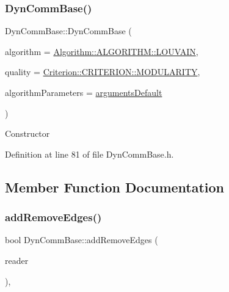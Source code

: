 \subsubsection{\texorpdfstring{Dyn\+Comm\+Base()}{DynCommBase()}\hspace{0.1cm}{\footnotesize\ttfamily [2/2]}}
{\footnotesize\ttfamily Dyn\+Comm\+Base\+::\+Dyn\+Comm\+Base (\begin{DoxyParamCaption}\item[{\hyperlink{classAlgorithm_a38e19a8c3dc51b97563a34d9e59a748d}{Algorithm\+::\+A\+L\+G\+O\+R\+I\+T\+HM}}]{algorithm = {\ttfamily \hyperlink{classAlgorithm_a38e19a8c3dc51b97563a34d9e59a748dab77e66715d6be972cdbf6cc4d990e732}{Algorithm\+::\+A\+L\+G\+O\+R\+I\+T\+H\+M\+::\+L\+O\+U\+V\+A\+IN}},  }\item[{const \hyperlink{classCriterion_a55594c223ce0837b8319c46c66cb648f}{Criterion\+::\+C\+R\+I\+T\+E\+R\+I\+ON} \&}]{quality = {\ttfamily \hyperlink{classCriterion_a55594c223ce0837b8319c46c66cb648fa2a7d416fbe43baf234420601ea73d946}{Criterion\+::\+C\+R\+I\+T\+E\+R\+I\+O\+N\+::\+M\+O\+D\+U\+L\+A\+R\+I\+TY}},  }\item[{\hyperlink{structProgramParameters}{Program\+Parameters} \&}]{algorithm\+Parameters = {\ttfamily \hyperlink{program_8h_ae2d819404495f80f31db7676c1329d19}{arguments\+Default}} }\end{DoxyParamCaption})\hspace{0.3cm}{\ttfamily [inline]}}

Constructor 

Definition at line 81 of file Dyn\+Comm\+Base.\+h.



\subsection{Member Function Documentation}
\mbox{\label{classDynCommBase_a85ff9898ef25b12f3e80842c7b2696fe}} 
\subsubsection{\texorpdfstring{add\+Remove\+Edges()}{addRemoveEdges()}}
{\footnotesize\ttfamily bool Dyn\+Comm\+Base\+::add\+Remove\+Edges (\begin{DoxyParamCaption}\item[{\hyperlink{classReaderInterface}{Reader\+Interface}$<$ \hyperlink{classEdge}{Edge} $>$ $\ast$}]{reader }\end{DoxyParamCaption})\hspace{0.3cm}{\ttfamily [inline]}, {\ttfamily [virtual]}}

